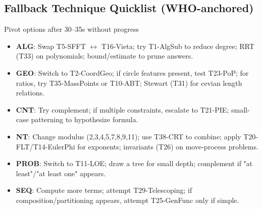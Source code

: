 \documentclass{article}
\begin{document}
\subsection*{Fallback Technique Quicklist (WHO-anchored)}
\begin{classifybox}{Pivot options after 30--35s without progress}
\begin{itemize}[nosep]
\item \textbf{ALG}: Swap T5-SFFT $\leftrightarrow$ T16-Vieta; try T1-AlgSub to reduce degree; RRT (T33) on polynomials; bound/estimate to prune answers.
\item \textbf{GEO}: Switch to T2-CoordGeo; if circle features present, test T23-PoP; for ratios, try T35-MassPoints or T10-ABT; Stewart (T31) for cevian length relations.
\item \textbf{CNT}: Try complement; if multiple constraints, escalate to T21-PIE; small-case patterning to hypothesize formula.
\item \textbf{NT}: Change modulus (2,3,4,5,7,8,9,11); use T38-CRT to combine; apply T20-FLT/T14-EulerPhi for exponents; invariants (T26) on move-process problems.
\item \textbf{PROB}: Switch to T11-LOE; draw a tree for small depth; complement if "at least"/"at least one" appears.
\item \textbf{SEQ}: Compute more terms; attempt T29-Telescoping; if composition/partitioning appears, attempt T25-GenFunc only if simple.
\end{itemize}
\end{classifybox}

\newpage
\end{document}
